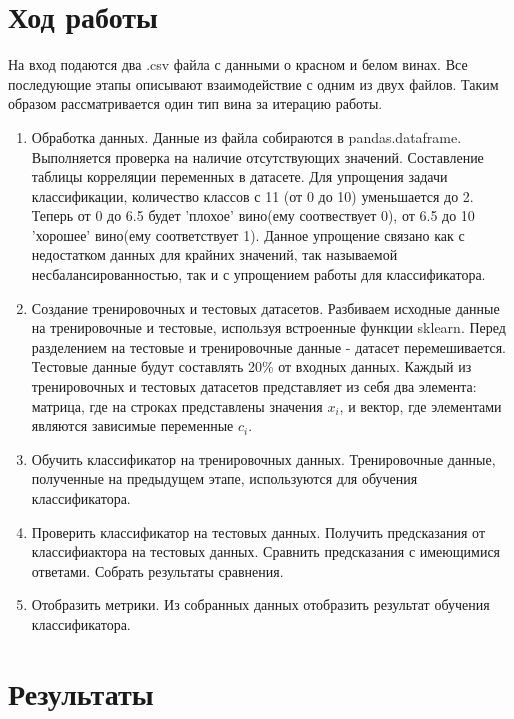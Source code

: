 \documentclass{article}
\begin{document}
\section{Ход работы}
На вход подаются два .csv файла с данными о красном и белом винах. Все последующие этапы описывают взаимодействие с одним из двух файлов. Таким образом рассматривается один тип вина за итерацию работы.
\begin{enumerate}
    \item Обработка данных. Данные из файла собираются в pandas.dataframe. Выполняется проверка на наличие отсутствующих значений. Составление таблицы корреляции переменных в датасете. Для упрощения задачи классификации, количество классов с 11 (от 0 до 10) уменьшается до 2. Теперь от 0 до 6.5 будет 'плохое' вино(ему соотвествует 0), от 6.5 до 10 'хорошее' вино(ему соответствует 1). Данное упрощение связано как с недостатком данных для крайних значений, так называемой несбалансированностью, так и с упрощением работы для классификатора.
    \item Создание тренировочных и тестовых датасетов. Разбиваем исходные данные на тренировочные и тестовые, используя встроенные функции sklearn. Перед разделением на тестовые и тренировочные данные -  датасет перемешивается. Тестовые данные будут составлять 20\% от входных данных. Каждый из тренировочных и тестовых датасетов представляет из себя два элемента: матрица, где на строках представлены значения $x_i$, и вектор, где элементами являются зависимые переменные $c_i$.
    \item Обучить классификатор на тренировочных данных. Тренировочные данные, полученные на предыдущем этапе, используются для обучения классификатора.
    \item Проверить классификатор на тестовых данных. Получить предсказания от классифиактора на тестовых данных. Сравнить предсказания с имеющимися ответами. Собрать результаты сравнения.
    \item Отобразить метрики. Из собранных данных отобразить результат обучения классификатора.
\end{enumerate}

\section{Результаты}
\end{document}
